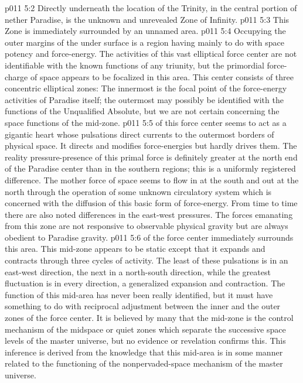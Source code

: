 \pc \vs p011 5:2 \bibnobreakspace Directly underneath the location of the Trinity, in the central portion of nether Paradise, is the unknown and unrevealed Zone of Infinity.
\pc \vs p011 5:3 \bibnobreakspace This Zone is immediately surrounded by an unnamed area.
\pc \vs p011 5:4 \bibnobreakspace Occupying the outer margins of the under surface is a region having mainly to do with space potency and force\hyp{}energy. The activities of this vast elliptical force center are not identifiable with the known functions of any triunity, but the primordial force\hyp{}charge of space appears to be focalized in this area. This center consists of three concentric elliptical zones: The innermost is the focal point of the force\hyp{}energy activities of Paradise itself; the outermost may possibly be identified with the functions of the Unqualified Absolute, but we are not certain concerning the space functions of the mid\hyp{}zone.
\pc \vs p011 5:5  of this force center seems to act as a gigantic heart whose pulsations direct currents to the outermost borders of physical space. It directs and modifies force\hyp{}energies but hardly drives them. The reality pressure\hyp{}presence of this primal force is definitely greater at the north end of the Paradise center than in the southern regions; this is a uniformly registered difference. The mother force of space seems to flow in at the south and out at the north through the operation of some unknown circulatory system which is concerned with the diffusion of this basic form of force\hyp{}energy. From time to time there are also noted differences in the east\hyp{}west pressures. The forces emanating from this zone are not responsive to observable physical gravity but are always obedient to Paradise gravity.
\pc \vs p011 5:6  of the force center immediately surrounds this area. This mid\hyp{}zone appears to be static except that it expands and contracts through three cycles of activity. The least of these pulsations is in an east\hyp{}west direction, the next in a north\hyp{}south direction, while the greatest fluctuation is in every direction, a generalized expansion and contraction. The function of this mid\hyp{}area has never been really identified, but it must have something to do with reciprocal adjustment between the inner and the outer zones of the force center. It is believed by many that the mid\hyp{}zone is the control mechanism of the midspace or quiet zones which separate the successive space levels of the master universe, but no evidence or revelation confirms this. This inference is derived from the knowledge that this mid\hyp{}area is in some manner related to the functioning of the nonpervaded\hyp{}space mechanism of the master universe.
